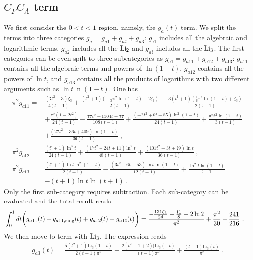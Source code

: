 \documentclass[a4paper,11pt]{article}
\begin{document}
\subsection{$C_FC_A$ term}
We first consider the $0<t<1$ region, namely, the $g_a(t)$ term. We split the terms into three categories $g_a=g_{a1}+g_{a2}+g_{a3}$: $g_{a1}$ includes all the algebraic and logarithmic terms, $g_{a2}$ includes all the ${\rm Li}_2$ and $g_{a3}$ includes all the ${\rm Li}_3$. The first categories can be even spilt to three subcategories as $g_{a1}=g_{a11}+g_{a12}+g_{a13}$: $g_{a11}$ contains all the algebraic terms and powers of $\ln(1-t)$, $g_{a12}$ contains all the powers of $\ln t$,  and $g_{a13}$ contains all the products of logarithms with two different arguments such as $\ln t \ln(1-t)$. One has
\begin{align}
\pi^2 g_{a11}=&\frac{\left(7 t^2+3\right) \zeta_3}{4 (t-1)}+\frac{\left(t^2+1\right) \left(-\frac{1}{3} \pi ^2 \ln (1-t)-2 \zeta_3\right)}{2 (t-1)}-\frac{3 \left(t^2+1\right) \left(\frac{1}{6} \pi ^2 \ln (1-t)+\zeta_3\right)}{2 (t-1)}\nonumber \\
&+\frac{\pi ^2 \left(1-2 t^2\right)}{24 (t-1)}-\frac{77 t^2-1104 t+77}{108 (t-1)}+\frac{\left(-3 t^2+6 t+85\right) \ln ^2(1-t)}{24 (t-1)}+\frac{\pi ^2 t^2 \ln (1-t)}{3(t-1)}\nonumber \\ 
&+\frac{\left(27 t^2-36 t+409\right) \ln (1-t)}{36 (t-1)} \ , \\ 
\pi^2g_{a12}=&\frac{\left(t^2+1\right) \ln ^3t}{24 (t-1)}+\frac{\left(17 t^2+24 t+11\right) \ln ^2t}{48 (t-1)}+\frac{\left(101 t^2+3 t+29\right) \ln t}{36 (t-1)} \ , \\ 
\pi^2 g_{a13}=&\frac{\left(t^2+1\right) \ln t \ln^2(1-t)}{2 (t-1)}-\frac{\left(3 t^2+6 t-53\right) \ln t \ln (1-t)}{12 (t-1)}+\frac{\ln^2 t \ln (1-t)}{t-1} \nonumber \\ 
&-(t+1) \ln t \ln (t+1) \ .
\end{align}
Only the first sub-category requires subtraction. Each sub-category can be evaluated and the total result reads
\begin{align}
&\int_{0}^1 dt \bigg(g_{a11}(t)-g_{a11,{\rm sing}}(t)+g_{a12}(t)+g_{a13}(t)\bigg)=\frac{-\frac{131 \zeta_3}{24}-\frac{11}{8}+2\ln 2}{\pi ^2}+\frac{\pi ^2}{30}+\frac{241}{216} \ .
\end{align}
We then move to term with ${\rm Li}_3$. The expression reads
\begin{align}
g_{a3}(t)=\frac{5(t^2+1) \text{Li}_3(1-t)}{2(t-1)\pi ^2}+\frac{2(t^2-1+2)) \text{Li}_3(-t)}{(t-1)\pi ^2}+\frac{\left(t+1\right) \text{Li}_3(t)}{\pi ^2} \ .
\end{align}
\end{document}
